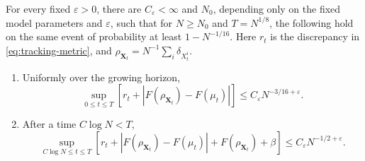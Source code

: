 \begin{proposition}
\label{prop:canonical-model-assumptions}
For every fixed $\varepsilon>0$, there are $C_\varepsilon<\infty$ and
$N_0$, depending only on the fixed model parameters and $\varepsilon$,
such that for $N\ge N_0$ and $T=N^{1/8}$, the following hold on the
same event of probability at least $1-N^{-1/16}$.
Here $r_t$ is the discrepancy in \eqref{eq:tracking-metric}, and
$\rho_{\mathbf X_t}=N^{-1}\sum_i\delta_{X_t^i}$.
\begin{enumerate}[label=(\roman*),leftmargin=*]
 \item Uniformly over the growing horizon,
 \begin{equation}
 \sup_{0\le t\le T}
 \left[r_t+|F(\rho_{\mathbf X_t})-F(\mu_t)|\right]
 \le C_\varepsilon N^{-3/16+\varepsilon}.
 \label{eq:canonical-growing-horizon-conclusion}
 \end{equation}
 \item After a time $C\log N<T$,
 \begin{equation}
 \sup_{C\log N\le t\le T}
 \left[r_t+|F(\rho_{\mathbf X_t})-F(\mu_t)|
             +F(\rho_{\mathbf X_t})+\beta\right]
 \le C_\varepsilon N^{-1/2+\varepsilon}.
 \label{eq:canonical-after-recovery-conclusion}
 \end{equation}
\end{enumerate}
\end{proposition}


